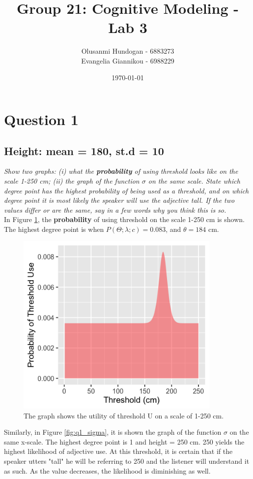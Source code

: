 \documentclass[11pt,a4paper,oneside]{article}
\title{\textbf{Group 21: Cognitive Modeling - Lab 3}}
\date{\today}
\author{Olusanmi Hundogan - 6883273\\
Evangelia Giannikou - 6988229\\
}
\begin{document}
\maketitle

\section{Question 1}
\label{Q1}
\subsection{Height: mean = 180, st.d = 10}
\textit{Show two graphs: (i) what the \textbf{probability} of using threshold looks like on the scale 1-250 cm; (ii) the graph of the function $\sigma$ on the same scale. State which degree point has the highest probability of being used as a threshold, and on which degree point it is most likely the speaker will use the adjective tall. If the two values differ or are the same, say in a few words why you think this is so.}\\

In Figure \ref{fig:q1_threshold}, the \textbf{probability} of using threshold on the scale 1-250 cm is shown. The highest degree point is when $ P(\Theta; \lambda; c) = 0.083$, and $\theta = 184$ cm.

\begin{figure}[H]
    \centering
    \includegraphics[width=100mm]{figs/Question_1_threshold.png}
    \caption{The graph shows the utility of threshold U on a scale of 1-250 cm.}
  \label{fig:q1_threshold}
\end{figure}

Similarly, in Figure \ref{fig:q1_sigma}, it is shown the graph of the function $\sigma$ on the same x-scale. The highest degree point is 1 and height = 250 cm. 250 yields the highest likelihood of adjective use. At this threshold, it is certain that if the speaker utters "tall" he will be referring to 250 and the listener will understand it as such. As the value decreases, the likelihood is diminishing as well.
\end{document}
